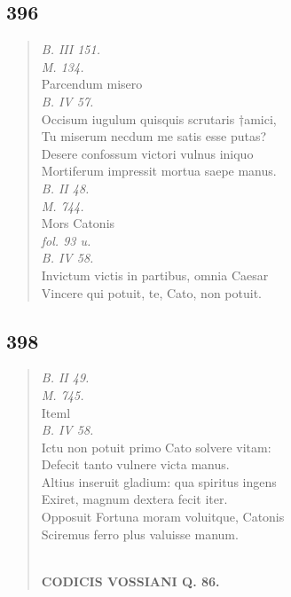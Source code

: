 \documentclass[11pt, a4paper]{report}
\begin{document}
            \subsection*{396}
      \begin{verse}
      \textit{B. III 151.} \\ \textit{M. 134.} \\ Parcendum misero \\ \textit{B. IV 57.} \\ Occisum iugulum quisquis scrutaris †amici, \\ Tu miserum necdum me satis esse putas? \\ Desere confossum victori vulnus iniquo \\ Mortiferum impressit mortua saepe manus. \\ \textit{B. II 48.} \\ \textit{M. 744.} \\ Mors Catonis \\ \textit{fol. 93 u.} \\ \textit{B. IV 58.} \\ Invictum victis in partibus, omnia Caesar \\ Vincere qui potuit, te, Cato, non potuit. \\ 
      \end{verse}
  
            \subsection*{398}
      \begin{verse}
      \textit{B. II 49.} \\ \textit{M. 745.} \\  \lbrack Iteml \\ \textit{B. IV 58.} \\ Ictu non potuit primo Cato solvere vitam: \\ Defecit tanto vulnere victa manus. \\ Altius inseruit gladium: qua spiritus ingens \\ Exiret, magnum dextera fecit iter. \\ Opposuit Fortuna moram voluitque, Catonis \\ Sciremus ferro plus valuisse manum. \\ 
        ﻿\pagebreak 
    \begin{center} \textbf{CODICIS VOSSIANI Q. 86.} \end{center}
      \end{verse}
  
\end{document}
